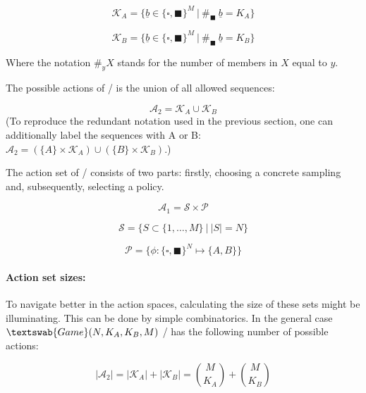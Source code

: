 \documentclass{article}
\newcommand{\wb}{\square}
\newcommand{\bb}{\blacksquare}
\theoremstyle{definition}
\newcommand{\G}[1]{$\textswab{Game}(#1)$}
\begin{document}
\begin{equation}
    \mathcal{K}_A = \{\underline{b} \in \{\wb,\bb\}^M \ | \ \#_\bb \ \underline{b} = K_A \}
\end{equation}

\begin{equation}
    \mathcal{K}_B = \{\underline{b} \in \{\wb,\bb\}^M \ | \ \#_\bb \ \underline{b} = K_B \}
\end{equation}

Where the notation $\#_y X$ stands for the number of members in $X$ equal to $y$.

The possible actions of \PII/ is the union of all allowed sequences:

\begin{equation}
    \mathcal{A}_2 = \mathcal{K}_A \cup \mathcal{K}_B
\end{equation}
(To reproduce the redundant notation used in the previous section, one can additionally label the sequences with A or B: $\mathcal{A}_2 = \left ( \{A\} \times \mathcal{K}_A \right ) \cup \left ( \{B\} \times \mathcal{K}_B \right )$.)

The action set of \PI/ consists of two parts: firstly, choosing a concrete sampling and, subsequently, selecting a policy.

\begin{equation}
    \mathcal{A}_1 = \mathcal{S} \times \mathcal{P}
\end{equation}

\begin{equation}
    \label{eq:SamplingSet}
    \mathcal{S} = \{ S \subset \{1,\dots,M \} \ | \  |S| = N \}
\end{equation}

\begin{equation}
    \mathcal{P} = \{ \phi : \{\wb,\bb\}^N \mapsto \{A,B\} \}
\end{equation}

\paragraph{Action set sizes:}

To navigate better in the action spaces, calculating the size of these sets might be illuminating. This can be done by simple combinatorics.
In the general case \G{N,K_A,K_B,M} \PII/ has the following number of possible actions:

\begin{equation}
    |\mathcal{A}_2| = |\mathcal{K}_A| + |\mathcal{K}_B|=  \binom{M}{K_A} + \binom{M}{K_B}
\end{equation}
\end{document}
